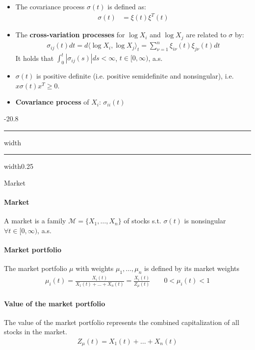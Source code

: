 \documentclass[a4paper,landscape,8pt,fleqn]{scrartcl}
\makeatletter
\renewcommand{\emph}[1]{\textbf{#1}}
\renewcommand{\section}{\@startsection{section}{1}{0mm}%
{-2\baselineskip}{0.8\baselineskip}%
{\hrule depth 0.2pt width\columnwidth\hrule depth1.5pt
width0.25\columnwidth\vspace*{1.2em}\Large\bfseries}}
\makeatother
\begin{document}
\begin{multicols*}{3}
\begin{itemize}
\item The covariance process $\sigma(t)$ is defined as:
\begin{align*}
\sigma(t) &= \xi(t) \xi^T(t)
\end{align*}
\item The \emph{cross-variation processes} for $\log X_i$ and $\log X_j$ are related to $\sigma$ by:
\begin{align*}
\sigma_{i j}(t) dt = d \langle \log X_i, \log X_j \rangle_t = \sum_{\nu=1}^n \xi_{i \nu}(t) \xi_{j \nu}(t) dt
\end{align*}
It holds that $\int_0^t |\sigma_{i j}(s)| ds < \infty$, $t \in [0,\infty)$, a.s.
\item $\sigma(t)$ is positive definite (i.e. positive semidefinite and nonsingular), i.e. $x \sigma(t) x^T \geq 0$.
\item \emph{Covariance process} of $X_i$: $\sigma_{i i}(t)$
\end{itemize}

\columnbreak

\section{Market}

\paragraph{Market}

A market is a family $\mathcal{M} = \lbrace X_1, \ldots, X_n \rbrace$ of stocks s.t. $\sigma(t)$ is nonsingular $\forall t \in [0, \infty)$, a.s.

\paragraph{Market portfolio}

The market portfolio $\mu$ with weights $\mu_1, \ldots, \mu_n$ is defined by its market weights
\begin{align*}
\mu_i(t) = \frac{X_i(t)}{X_1(t) + \ldots + X_n(t)} = \frac{X_i(t)}{Z_\mu(t)} \qquad 0 < \mu_i(t) < 1
\end{align*}

\paragraph{Value of the market portfolio}

The value of the market portfolio represents the combined capitalization of all stocks in the market.
\begin{align*}
Z_\mu(t) = X_1(t) + \ldots + X_n(t)
\end{align*}


\end{multicols*}
\end{document}
